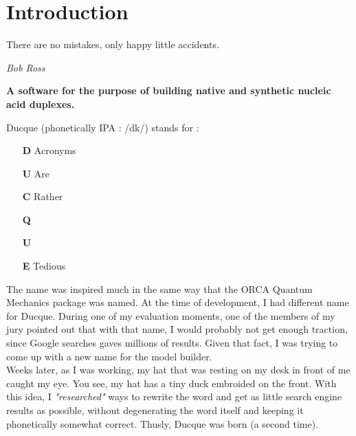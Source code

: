 \pagebreak
\section{Introduction}


\epigraph{ There are no mistakes, only happy little accidents.}{\textit{Bob Ross}}

\begin{center}
\textbf{A software for the purpose of building native and synthetic nucleic acid duplexes.}\\
\end{center}

\noindent Ducque (\colorbox{gray1}{phonetically IPA : /dk/}) stands for :
\vspace{-1.5mm}
\begin{itemize}[leftmargin=*]
    \setlength\itemsep{-1.5mm}
    \item[\textbf{D}] Acronyms %
    \item[\textbf{U}] Are      %
    \item[\textbf{C}] Rather   %
    \item[\textbf{Q}]          %
    \item[\textbf{U}]          %
    \item[\textbf{E}] Tedious  %
\end{itemize}

\noindent The name was inspired much in the same way that the ORCA Quantum Mechanics package\cite{Neese2020Orca, Neese2022ORCA} was named.
At the time of development, I had different name for Ducque. During one of my evaluation moments, one of the members of my jury pointed out that with that name,
I would probably not get enough traction, since Google searches gaves millions of results. Given that fact, I was trying to come up with a new name for the model builder.\\
Weeks later, as I was working, my hat that was resting on my desk in front of me caught my eye. You see, my hat has a tiny duck embroided on the front. With this idea, I \textit{"researched"} ways to rewrite the word and get as little search engine results as possible, without degenerating the word itself and keeping it phonetically somewhat correct. Thusly, Ducque was born (a second time).\\
\\
